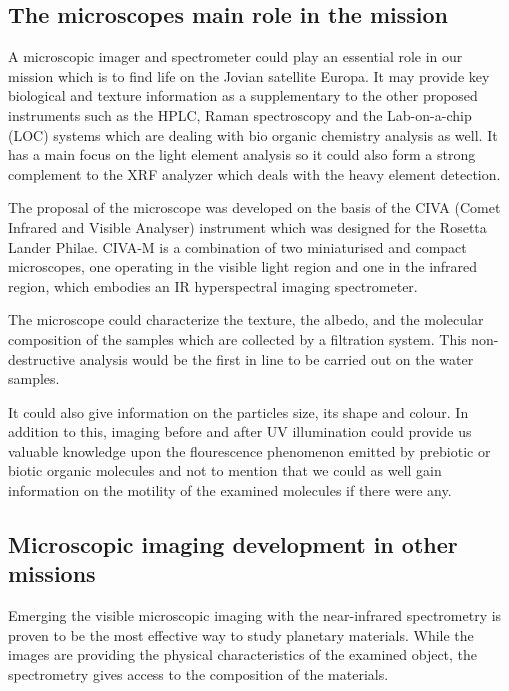 
\subsection{The microscopes main role in the mission}

A microscopic imager and spectrometer could play an essential role in our mission which is to find life on the Jovian satellite Europa. It may provide key biological and texture information as a supplementary to the other proposed instruments such as the HPLC, Raman spectroscopy and the Lab-on-a-chip (LOC) systems which are dealing with bio organic chemistry analysis as well. It has a main focus on the light element analysis so it could also form a strong complement to the XRF analyzer which deals with the heavy element detection.

The proposal of the microscope was developed on the basis of the CIVA (Comet Infrared and Visible Analyser) instrument which was designed for the Rosetta Lander Philae. CIVA-M is a combination of two miniaturised and compact microscopes, one operating in the visible light region and one in the infrared region, which embodies an IR hyperspectral imaging spectrometer.
\cite{Bibring2007}

The microscope could characterize the texture, the albedo, and the molecular composition of the samples which are collected by a filtration system. This non-destructive analysis would be the first in line to be carried out on the water samples.

It could also give information on the particles size, its shape and colour. In addition to this, imaging before and after UV illumination could provide us valuable knowledge upon the flourescence phenomenon emitted by prebiotic or biotic organic molecules and not to mention that we could as well gain information on the motility of the examined molecules if there were any.
\cite{Gowen2011725}

\subsection{Microscopic imaging development in other missions}
Emerging the visible microscopic imaging with the near-infrared spectrometry is proven to be the most effective way to study planetary materials. While the images are providing the physical characteristics of the examined object, the spectrometry gives access to the composition of the materials.

